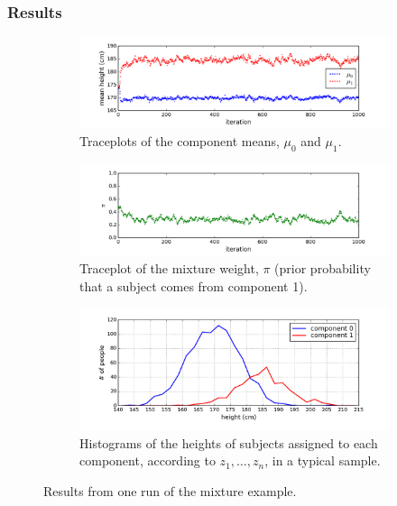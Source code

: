 \documentclass[12pt]{article}
\begin{document}
\subsubsection{Results}

\begin{figure}
    \centering
    \begin{subfigure}[t]{1\textwidth}
        \centering
        \includegraphics[trim=0 0.4cm 0 0, clip, width=1\textwidth]{mix-mu_trace-a.png}
        \caption{Traceplots of the component means, $\mu_0$ and $\mu_1$.}
    \end{subfigure}
    \begin{subfigure}[t]{1\textwidth}
        \centering
        \includegraphics[trim=0 0.4cm 0 0, clip, width=1\textwidth]{mix-p_trace-a.png}
        \caption{Traceplot of the mixture weight, $\pi$ (prior probability that a subject comes from component 1).}
    \end{subfigure}
    \begin{subfigure}[t]{1\textwidth}
        \centering
        \includegraphics[trim=0 0.4cm 0 0, clip, width=1\textwidth]{mix-histograms_at_last_sample-a.png}
        \caption{Histograms of the heights of subjects assigned to each component, according to $z_1,\ldots,z_n$, in a typical sample.}
    \end{subfigure}
    \vspace{.5em}
    \caption{Results from one run of the mixture example.}
    \label{figure:mix}
\end{figure}
\end{document}

